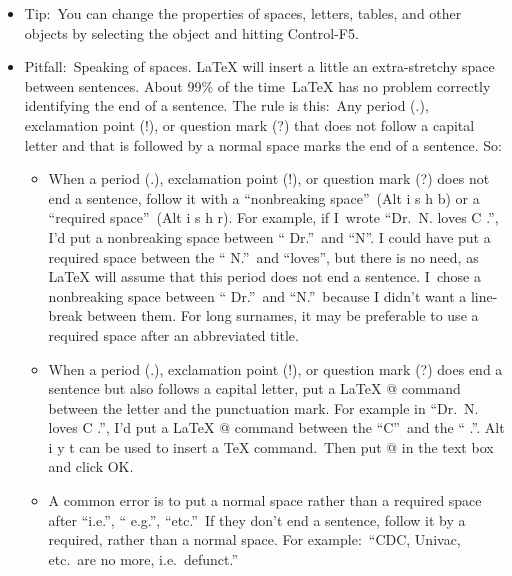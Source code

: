 \begin{itemize}
\item Tip:\ You can change the properties of spaces, letters, tables, and
other objects by selecting the object and hitting Control-F5.

\item Pitfall:\ Speaking of spaces. LaTeX will insert a little an
extra-stretchy space between sentences. About 99\% of the time\ LaTeX has no
problem correctly identifying the end of a sentence. The rule is this:\ Any
period (.), exclamation point (!), or question mark (?) that does not follow
a capital letter and that is followed by a normal space marks the end of a
sentence. So:

\begin{itemize}
\item When a period (.), exclamation point (!), or question mark (?) does
not end a sentence, follow it with a \textquotedblleft nonbreaking
space\textquotedblright\ (Alt i s h b) or a \textquotedblleft required
space\textquotedblright\ (Alt i s h r). For example, if I\ wrote
\textquotedblleft Dr.~N. loves C%
\@%
.\textquotedblright , I'd put a nonbreaking space between \textquotedblleft
Dr.\textquotedblright\ and \textquotedblleft N\textquotedblright . I could
have put a required space between the \textquotedblleft
N.\textquotedblright\ and \textquotedblleft loves\textquotedblright , but
there is no need, as LaTeX will assume that this period does not end a
sentence. I\ chose a nonbreaking space between \textquotedblleft
Dr.\textquotedblright\ and \textquotedblleft N.\textquotedblright\ because I
didn't want a line-break between them. For long surnames, it may be
preferable to use a required space after an abbreviated title.

\item When a period (.), exclamation point (!), or question mark (?) does
end a sentence but also follows a capital letter, put a LaTeX \TEXTsymbol{%
\backslash}@ command between the letter and the punctuation mark. For
example in \textquotedblleft Dr.~N. loves C%
\@%
.\textquotedblright , I'd put a LaTeX \TEXTsymbol{\backslash}@ command
between the \textquotedblleft C\textquotedblright\ and the \textquotedblleft
.\textquotedblright . Alt i y t can be used to insert a TeX command.\ Then
put \TEXTsymbol{\backslash}@ in the text box and click OK.

\item A common error is to put a normal space rather than a required space
after \textquotedblleft i.e.\textquotedblright , \textquotedblleft
e.g.\textquotedblright , \textquotedblleft etc.\textquotedblright\ If they
don't end a sentence, follow it by a required, rather than a normal space.
For example:\ \textquotedblleft CDC, Univac, etc.\ are no more, i.e.\
defunct.\textquotedblright


\end{itemize}
\end{itemize}
